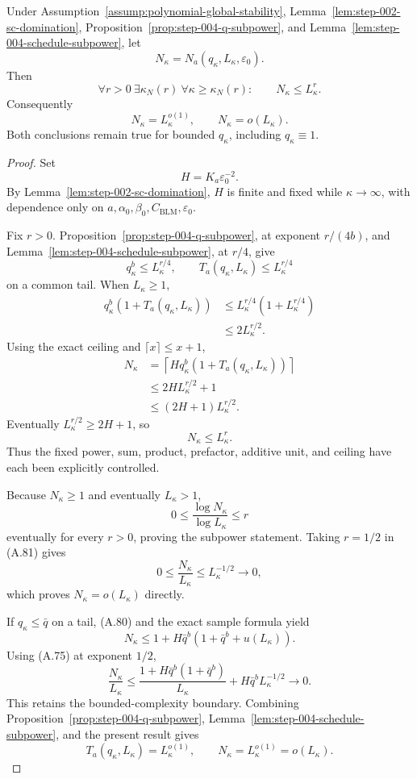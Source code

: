 \begin{proposition}
\label{prop:step-004-sample-subpower}
Under Assumption~\ref{assump:polynomial-global-stability},
Lemma~\ref{lem:step-002-sc-domination},
Proposition~\ref{prop:step-004-q-subpower}, and
Lemma~\ref{lem:step-004-schedule-subpower}, let
\[
N_\kappa=N_a(q_\kappa,L_\kappa,\varepsilon_0).
\]
Then
\[
\forall r>0\ \exists\kappa_N(r)\
\forall\kappa\geq\kappa_N(r):
\qquad N_\kappa\leq L_\kappa^r.
\tag{A.81}
\]
Consequently
\[
N_\kappa=L_\kappa^{o(1)},\qquad
N_\kappa=o(L_\kappa).
\tag{A.82}
\]
Both conclusions remain true for bounded \(q_\kappa\), including
\(q_\kappa\equiv1\).
\end{proposition}

\begin{proof}
Set
\[
H=K_a\varepsilon_0^{-2}.
\tag{A.83}
\]
By Lemma~\ref{lem:step-002-sc-domination}, \(H\) is finite and fixed
while \(\kappa\to\infty\), with dependence only on
\(a,\alpha_0,\beta_0,C_{\mathrm{BLM}},\varepsilon_0\).

Fix \(r>0\).  Proposition~\ref{prop:step-004-q-subpower}, at exponent
\(r/(4b)\), and Lemma~\ref{lem:step-004-schedule-subpower}, at
\(r/4\), give
\[
q_\kappa^b\leq L_\kappa^{r/4},\qquad
T_a(q_\kappa,L_\kappa)\leq L_\kappa^{r/4}
\tag{A.84}
\]
on a common tail.  When \(L_\kappa\geq1\),
\[
\begin{aligned}
q_\kappa^b(1+T_a(q_\kappa,L_\kappa))
&\leq
L_\kappa^{r/4}(1+L_\kappa^{r/4})\\
&\leq2L_\kappa^{r/2}.
\end{aligned}
\tag{A.85}
\]
Using the exact ceiling and \(\lceil x\rceil\leq x+1\),
\[
\begin{aligned}
N_\kappa
&=\left\lceil
Hq_\kappa^b(1+T_a(q_\kappa,L_\kappa))
\right\rceil\\
&\leq2HL_\kappa^{r/2}+1\\
&\leq(2H+1)L_\kappa^{r/2}.
\end{aligned}
\tag{A.86}
\]
Eventually \(L_\kappa^{r/2}\geq2H+1\), so
\[
N_\kappa\leq L_\kappa^r.
\tag{A.87}
\]
Thus the fixed power, sum, product, prefactor, additive unit, and
ceiling have each been explicitly controlled.

Because \(N_\kappa\geq1\) and eventually \(L_\kappa>1\),
\[
0\leq\frac{\log N_\kappa}{\log L_\kappa}\leq r
\tag{A.88}
\]
eventually for every \(r>0\), proving the subpower statement.
Taking \(r=1/2\) in (A.81) gives
\[
0\leq\frac{N_\kappa}{L_\kappa}
\leq L_\kappa^{-1/2}
\longrightarrow0,
\tag{A.89}
\]
which proves \(N_\kappa=o(L_\kappa)\) directly.

If \(q_\kappa\leq\bar q\) on a tail, (A.80) and the exact sample
formula yield
\[
N_\kappa
\leq1+H\bar q^b
(1+\bar q^b+u(L_\kappa)).
\tag{A.90}
\]
Using (A.75) at exponent \(1/2\),
\[
\frac{N_\kappa}{L_\kappa}
\leq
\frac{1+H\bar q^b(1+\bar q^b)}{L_\kappa}
+H\bar q^bL_\kappa^{-1/2}
\longrightarrow0.
\tag{A.91}
\]
This retains the bounded-complexity boundary.  Combining
Proposition~\ref{prop:step-004-q-subpower},
Lemma~\ref{lem:step-004-schedule-subpower}, and the present result
gives
\[
T_a(q_\kappa,L_\kappa)=L_\kappa^{o(1)},\qquad
N_\kappa=L_\kappa^{o(1)}=o(L_\kappa).
\tag{A.92}
\]
\end{proof}

